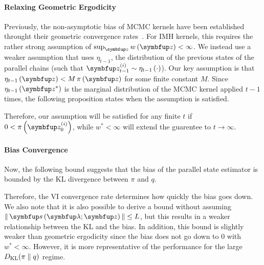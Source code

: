 \vspace{-0.05in}
\paragraph{Relaxing Geometric Ergodicity}
Previously, the non-asymptotic bias of MCMC kernels have been established throught their geometric convergence rates~\citep{jiang_mcmc_2021}.
For IMH kernels, this requires the rather strong assumption of \(\sup_{\vz} w\left(\vz\right) < \infty\).
We instead use a weaker assumption that uses \(\eta_{t-1}\), the distribution of the previous states of the parallel chains (such that \(\vz^{(i)}_{t-1} \sim \eta_{t-1}\left(\cdot\right)\)).
Our key assumption is that \(\eta_{t-1}\left(\vz\right) < M\,\pi\left(\vz\right)\) for some finite constant \(M\).
Since \(\eta_{t-1}\left(\vz^*\right)\) is the marginal distribution of the MCMC kernel applied \(t-1\) times,
the following proposition states when the assumption is satisfied.



Therefore, our assumption will be satisfied for any finite \(t\) if \(0 < \pi\left(\vz_0^{(i)}\right)\), while \(w^* < \infty\) will extend the guarentee to \(t \rightarrow \infty\).

\vspace{-0.05in}
\paragraph{Bias Convergence}
Now, the following bound suggests that the bias of the parallel state estimator is bounded by the KL divergence between \(\pi\) and \(q\).



Therefore, the VI convergence rate determines how quickly the bias goes down.
We also note that it is also possible to derive a bound without assuming \(\norm{\vs\left(\vlambda; \vz\right)} \leq L\), but this results in a weaker relationship between the KL and the bias.
In addition, this bound is slightly weaker than geometric ergodicity since the bias does not go down to 0 with \(w^* < \infty\).
However, it is more representative of the performance for the large \(D_{\mathrm{KL}}(\pi\parallel q)\) regime.


